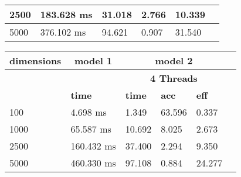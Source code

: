 \documentclass{article}
\begin{document}
\begin{table}
\begin{tabular}{|l|l|l|l|l|l|}
2500
 & 183.628 ms & 31.018 & 2.766 & 10.339\\ \hline
5000
 & 376.102 ms & 94.621 & 0.907 & 31.540\\ \hline
\end{tabular}
\end{table}\begin{table}
\begin{tabular}{|l|l|l|l|l|l|}\hline
\multicolumn{1}{|c|}{\textbf{dimensions}} &\multicolumn{1}{|c|}{\textbf{model 1}} &\multicolumn{3}{|c|}{\textbf{model 2}}\\ \hline
& & \multicolumn{3}{c|}{\textbf{4 Threads}} \\ \hline
& \textbf{time} & \textbf{time} & \textbf{acc} & \textbf{eff}\\ \hline
100
 & 4.698 ms & 1.349 & 63.596 & 0.337\\ \hline
1000
 & 65.587 ms & 10.692 & 8.025 & 2.673\\ \hline
2500
 & 160.432 ms & 37.400 & 2.294 & 9.350\\ \hline
5000
 & 460.330 ms & 97.108 & 0.884 & 24.277\\ \hline
\end{tabular}
\end{table}
\end{document}
